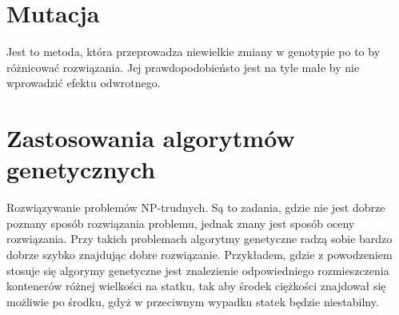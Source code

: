 \documentclass[bibtotocnumbered, headsepline,normalheadings,12pt,polish]{scrreprt}
\begin{document}
\section{ Mutacja}
Jest to metoda, która przeprowadza niewielkie zmiany w genotypie po to by różnicować rozwiązania. Jej prawdopodobieństo jest na tyle małe by nie wprowadzić efektu odwrotnego.

\section{ Zastosowania algorytmów genetycznych  }
Rozwiązywanie problemów NP-trudnych. Są to zadania, gdzie nie jest dobrze poznany sposób rozwiązania problemu, jednak znany jest sposób oceny rozwiązania. Przy takich problemach algorytmy genetyczne radzą sobie bardzo dobrze szybko znajdując dobre rozwiązanie.
Przykładem, gdzie z powodzeniem stosuje się algorymy genetyczne jest znalezienie odpowiedniego rozmieszczenia kontenerów różnej wielkości na statku, tak aby środek ciężkości znajdował się możliwie po środku, gdyż w przeciwnym wypadku statek będzie niestabilny.
\end{document}
